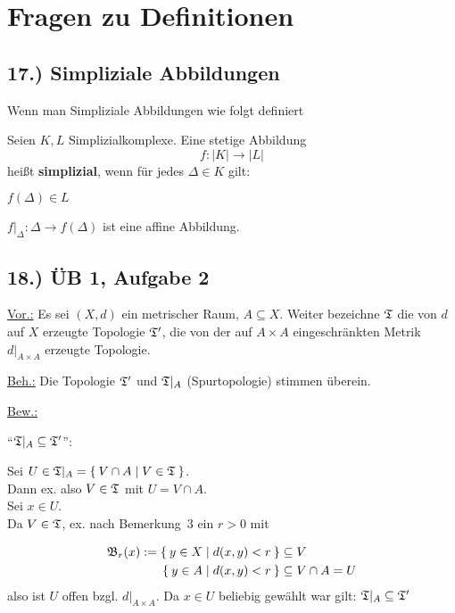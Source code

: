\documentclass[a5paper,oneside]{scrbook}
\begin{document}
\chapter{Fragen zu Definitionen}

\section*{17.) Simpliziale Abbildungen}
Wenn man Simpliziale Abbildungen wie folgt definiert

\begin{definition}%
    Seien $K, L$ Simplizialkomplexe. Eine stetige Abbildung
    \[f:|K| \rightarrow |L|\]
    heißt \textbf{simplizial}, wenn für
    jedes $\Delta \in K$ gilt:
    \begin{defenum}
        \item $f(\Delta) \in L$
        \item $f|_{\Delta} : \Delta \rightarrow f(\Delta)$ ist eine
              affine Abbildung.
    \end{defenum}
\end{definition}


\section*{18.) ÜB 1, Aufgabe 2}
\underline{Vor.:} Es sei $(X, d)$ ein metrischer Raum, $A \subseteq X$. 
Weiter bezeichne $\mathfrak{T}$ die von $d$ auf $X$ erzeugte Topologie $\mathfrak{T}'$, die von
der auf $A \times A$ eingeschränkten Metrik $d|_{A \times A}$ erzeugte Topologie.

\underline{Beh.:} Die Topologie $\mathfrak{T}'$ und $\mathfrak{T}|_A$ (Spurtopologie) stimmen überein.

\underline{Bew.:}

\enquote{$\mathfrak{T}|_A \subseteq \mathfrak{T}'$}:

Sei $U \in \mathfrak{T}|_A = \Set{V \cap A | V \in \mathfrak{T}}$.\\
Dann ex. also $V \in \mathfrak{T}$ mit
$U = V \cap A$.\\
Sei $x \in U$.\\
Da $V \in \mathfrak{T}$, ex. nach Bemerkung~3 ein $r > 0$ mit 

\begin{align*}
    \mathfrak{B}_r(x) := \Set{y \in X | d(x,y) < r} &\subseteq V\\
                \Set{y \in A | d(x,y) < r} &\subseteq V \cap A = U
\end{align*}
also ist $U$ offen bzgl. $d|_{A \times A}$.
Da $x \in U$ beliebig gewählt war gilt: $\mathfrak{T}|_A \subseteq \mathfrak{T}'$
\end{document}
